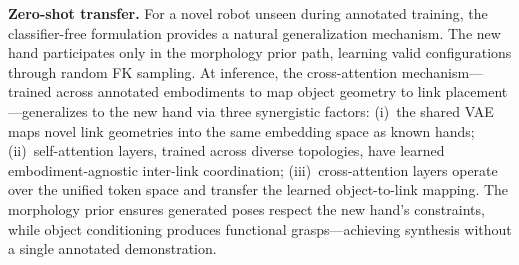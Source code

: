 \noindent\textbf{Zero-shot transfer.}
For a novel robot unseen during annotated training, the classifier-free formulation provides a natural generalization mechanism.
The new hand participates only in the morphology prior path, learning valid configurations through random FK sampling.
At inference, the cross-attention mechanism---trained across annotated embodiments to map object geometry to link placement---generalizes to the new hand via three synergistic factors:
(i)~the shared VAE maps novel link geometries into the same embedding space as known hands;
(ii)~self-attention layers, trained across diverse topologies, have learned embodiment-agnostic inter-link coordination;
(iii)~cross-attention layers operate over the unified token space and transfer the learned object-to-link mapping.
The morphology prior ensures generated poses respect the new hand's constraints, while object conditioning produces functional grasps---achieving synthesis without a single annotated demonstration.
